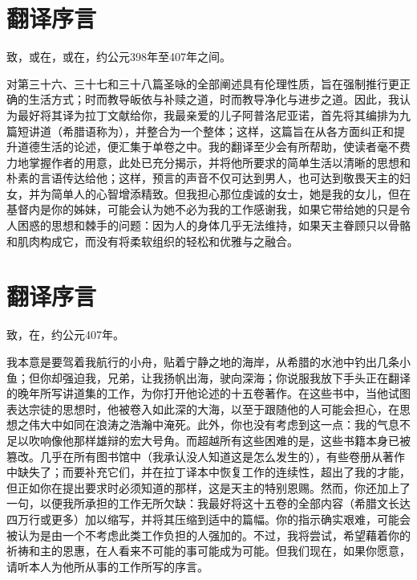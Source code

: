 
\section{翻译序言}

致，或在，或在，约公元398年至407年之间。\par

对第三十六、三十七和三十八篇圣咏的全部阐述具有伦理性质，旨在强制推行更正确的生活方式；时而教导皈依与补赎之道，时而教导净化与进步之道。因此，我认为最好将其译为拉丁文献给你，我最亲爱的儿子阿普洛尼亚诺，首先将其编排为九篇短讲道（希腊语称为），并整合为一个整体；这样，这篇旨在从各方面纠正和提升道德生活的论述，便汇集于单卷之中。我的翻译至少会有所帮助，使读者毫不费力地掌握作者的用意，此处已充分揭示，并将他所要求的简单生活以清晰的思想和朴素的言语传达给他；这样，预言的声音不仅可达到男人，也可达到敬畏天主的妇女，并为简单人的心智增添精致。但我担心那位虔诚的女士，她是我的女儿，但在基督内是你的姊妹，可能会认为她不必为我的工作感谢我，如果它带给她的只是令人困惑的思想和棘手的问题：因为人的身体几乎无法维持，如果天主眷顾只以骨骼和肌肉构成它，而没有将柔软组织的轻松和优雅与之融合。\par


\section{翻译序言}

致，在，约公元407年。\par

我本意是要驾着我航行的小舟，贴着宁静之地的海岸，从希腊的水池中钓出几条小鱼；但你却强迫我，兄弟，让我扬帆出海，驶向深海；你说服我放下手头正在翻译的晚年所写讲道集的工作，为你打开他论述的十五卷著作。在这些书中，当他试图表达宗徒的思想时，他被卷入如此深的大海，以至于跟随他的人可能会担心，在思想之伟大中如同在浪涛之浩瀚中淹死。此外，你也没有考虑到这一点：我的气息不足以吹响像他那样雄辩的宏大号角。而超越所有这些困难的是，这些书籍本身已被篡改。几乎在所有图书馆中（我承认没人知道这是怎么发生的），有些卷册从著作中缺失了；而要补充它们，并在拉丁译本中恢复工作的连续性，超出了我的才能，但正如你在提出要求时必须知道的那样，这是天主的特别恩赐。然而，你还加上了一句，以便我所承担的工作无所欠缺：我最好将这十五卷的全部内容（希腊文长达四万行或更多）加以缩写，并将其压缩到适中的篇幅。你的指示确实艰难，可能会被认为是由一个不考虑此类工作负担的人强加的。不过，我将尝试，希望藉着你的祈祷和主的恩惠，在人看来不可能的事可能成为可能。但我们现在，如果你愿意，请听本人为他所从事的工作所写的序言。\par

